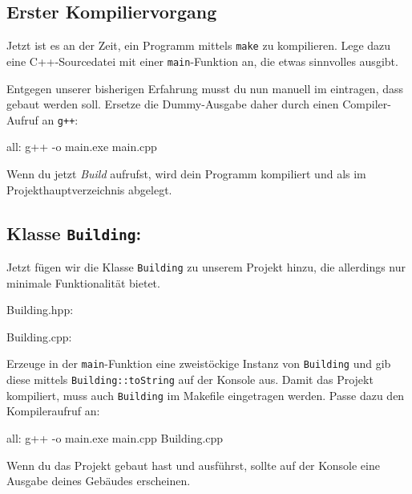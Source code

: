 \subsection{Erster Kompiliervorgang}
Jetzt ist es an der Zeit, ein Programm mittels \texttt{make} zu kompilieren.
Lege dazu eine C++-Sourcedatei  mit einer \lstinline{main}-Funktion an, die etwas sinnvolles ausgibt.

Entgegen unserer bisherigen Erfahrung musst du nun manuell im  eintragen, dass  gebaut werden soll.
Ersetze die Dummy-Ausgabe daher durch einen Compiler-Aufruf an \texttt{g++}:
\begin{lstmake}
all:
    g++ -o main.exe main.cpp
\end{lstmake}

Wenn du jetzt \emph{Build} aufrufst, wird dein Programm kompiliert und als  im Projekthauptverzeichnis abgelegt.


\subsection{Klasse \lstinline{Building}:}
Jetzt fügen wir die Klasse \lstinline{Building} zu unserem Projekt hinzu, die allerdings nur minimale Funktionalität bietet.

Building.hpp:
\begin{minipage}[t]{.45\textwidth}
\end{minipage}

Building.cpp:
\begin{minipage}[t]{.5\textwidth}
\end{minipage}

Erzeuge in der \lstinline{main}-Funktion eine zweistöckige Instanz von \lstinline{Building} und gib diese mittels \lstinline{Building::toString} auf der Konsole aus.
Damit das Projekt kompiliert, muss auch \lstinline{Building} im Makefile eingetragen werden.
Passe dazu den Kompileraufruf an:
\begin{lstmake}
all:
    g++ -o main.exe main.cpp Building.cpp
\end{lstmake}

Wenn du das Projekt gebaut hast und ausführst, sollte auf der Konsole eine Ausgabe deines Gebäudes erscheinen.

